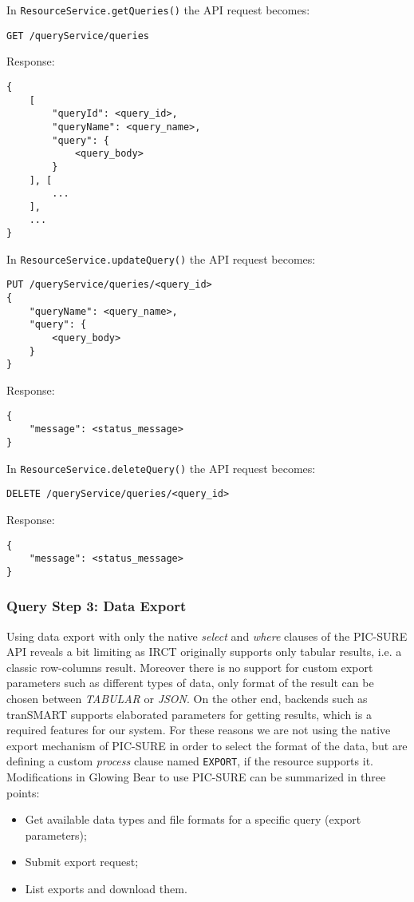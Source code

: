 In  \verb|ResourceService.getQueries()| the API request becomes:
\begin{verbatim}
GET /queryService/queries
\end{verbatim}

Response:
\begin{verbatim}
{
    [
        "queryId": <query_id>,
        "queryName": <query_name>,
        "query": {
            <query_body>
        }
    ], [
        ...
    ],
    ...
}    
\end{verbatim}

In  \verb|ResourceService.updateQuery()| the API request becomes:
\begin{verbatim}
PUT /queryService/queries/<query_id>
{
    "queryName": <query_name>,
    "query": {
        <query_body>
    }
}
\end{verbatim}

Response:
\begin{verbatim}
{
    "message": <status_message>
} 
\end{verbatim}

In  \verb|ResourceService.deleteQuery()| the API request becomes:
\begin{verbatim}
DELETE /queryService/queries/<query_id>
\end{verbatim}

Response:
\begin{verbatim}
{
    "message": <status_message>
} 
\end{verbatim}


\subsubsection{Query Step 3:  Data Export}

Using data export with only the native \emph{select} and \emph{where} clauses of the PIC-SURE API reveals a bit limiting as IRCT originally supports only tabular results, i.e. a classic row-columns result.
Moreover there is no support for custom export parameters such as different types of data, only format of the result can be chosen between \emph{TABULAR} or \emph{JSON}.
On the other end, backends such as tranSMART supports elaborated parameters for getting results, which is a required features for our system.
For these reasons we are not using the native export mechanism of PIC-SURE in order to select the format of the data, but are defining a custom \emph{process} clause named \verb|EXPORT|, if the resource supports it.
Modifications in Glowing Bear to use PIC-SURE can be summarized in three points:
\begin{itemize}
    \item Get available data types and file formats for a specific query (export parameters);
    \item Submit export request;
    \item List exports and download them.
\end{itemize}

